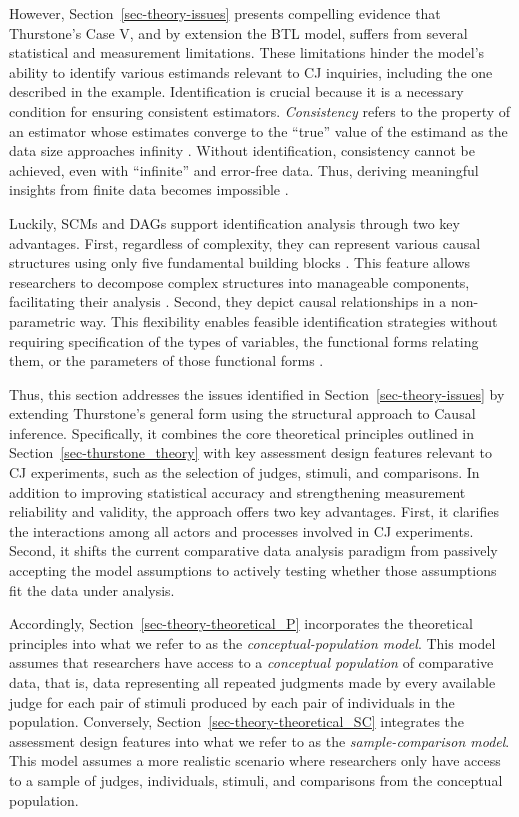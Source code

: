 \documentclass[
  authoryear,
  review,
  1p]{elsarticle}
\begin{document}
However, Section~\ref{sec-theory-issues} presents compelling evidence
that Thurstone's Case V, and by extension the BTL model, suffers from
several statistical and measurement limitations. These limitations
hinder the model's ability to identify various estimands relevant to CJ
inquiries, including the one described in the example. Identification is
crucial because it is a necessary condition for ensuring consistent
estimators. \emph{Consistency} refers to the property of an estimator
whose estimates converge to the ``true'' value of the estimand as the
data size approaches infinity \citep{Everitt_et_al_2010}. Without
identification, consistency cannot be achieved, even with ``infinite''
and error-free data. Thus, deriving meaningful insights from finite data
becomes impossible \citep[pp.~5]{Schuessler_et_al_2023}.

Luckily, SCMs and DAGs support identification analysis through two key
advantages. First, regardless of complexity, they can represent various
causal structures using only five fundamental building blocks
\citep{Neal_2020, McElreath_2020}. This feature allows researchers to
decompose complex structures into manageable components, facilitating
their analysis \citep{McElreath_2020}. Second, they depict causal
relationships in a non-parametric way. This flexibility enables feasible
identification strategies without requiring specification of the types
of variables, the functional forms relating them, or the parameters of
those functional forms \citep[pp.~35]{Pearl_et_al_2016}.

Thus, this section addresses the issues identified in
Section~\ref{sec-theory-issues} by extending Thurstone's general form
using the structural approach to Causal inference. Specifically, it
combines the core theoretical principles outlined in
Section~\ref{sec-thurstone_theory} with key assessment design features
relevant to CJ experiments, such as the selection of judges, stimuli,
and comparisons. In addition to improving statistical accuracy and
strengthening measurement reliability and validity, the approach offers
two key advantages. First, it clarifies the interactions among all
actors and processes involved in CJ experiments. Second, it shifts the
current comparative data analysis paradigm from passively accepting the
model assumptions to actively testing whether those assumptions fit the
data under analysis.

Accordingly, Section~\ref{sec-theory-theoretical_P} incorporates the
theoretical principles into what we refer to as the
\emph{conceptual-population model}. This model assumes that researchers
have access to a \emph{conceptual population} of comparative data, that
is, data representing all repeated judgments made by every available
judge for each pair of stimuli produced by each pair of individuals in
the population. Conversely, Section~\ref{sec-theory-theoretical_SC}
integrates the assessment design features into what we refer to as the
\emph{sample-comparison model}. This model assumes a more realistic
scenario where researchers only have access to a sample of judges,
individuals, stimuli, and comparisons from the conceptual population.
\end{document}
